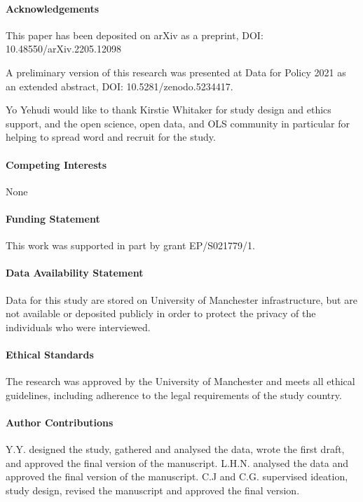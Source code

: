 \documentclass{CUP-JNL-DAP}%
\begin{document}
\begin{Backmatter}

\paragraph{Acknowledgements}
This paper has been deposited on arXiv as a preprint, DOI: 10.48550/arXiv.2205.12098

A preliminary version of this research was presented at Data for Policy 2021 as an extended abstract, DOI: 10.5281/zenodo.5234417. 

Yo Yehudi would like to thank Kirstie Whitaker for study design and ethics support, and the open science, open data, and OLS community in particular for helping to spread word and recruit for the study.

\paragraph{Competing Interests}
None

\paragraph{Funding Statement}
This work was supported in part by grant EP/S021779/1.

\paragraph{Data Availability Statement}
Data for this study are stored on University of Manchester infrastructure, but are not available or deposited publicly in order to protect the privacy of the individuals who were interviewed.

\paragraph{Ethical Standards}
The research was approved by the University of Manchester and meets all ethical guidelines, including adherence to the legal requirements of the study country.

\paragraph{Author Contributions}
Y.Y. designed the study, gathered and analysed the data, wrote the first draft, and approved the final version of the manuscript. L.H.N. analysed the data and approved the final version of the manuscript. C.J and C.G. supervised ideation, study design, revised the manuscript and approved the final version. 


\end{Backmatter}
\end{document}
